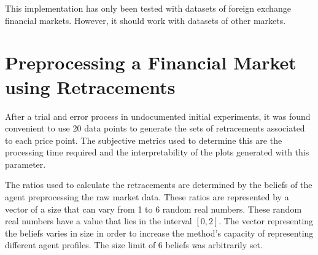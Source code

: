 This implementation has only been tested with datasets of foreign exchange
financial markets. However, it should work with datasets of other
markets.

\section{Preprocessing a Financial Market using Retracements}
\label{section:preprocessing-a-financial-market-using-retracements:implementation}

After a trial and error process in undocumented initial experiments, it was
found convenient to use 20 data points to generate the sets of retracements
associated to each price point. The subjective metrics used to determine this
are the processing time required and the interpretability of the plots generated
with this parameter. %

The ratios used to calculate the retracements are determined by the beliefs of
the agent preprocessing the raw market data. These ratios are represented by a
vector of a size that can vary from 1 to 6 random real numbers. These random
real numbers have a value that lies in the interval $[0, 2]$. The vector
representing the beliefs varies in size in order to increase the method's
capacity of representing different agent profiles. The size limit of 6 beliefs
was arbitrarily set.

